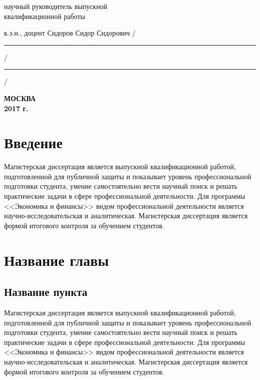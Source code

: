 \documentclass[12pt,a4paper, oneside]{extreport}
\begin{document}
\noindent
научный руководитель выпускной \\
квалификационной работы

\noindent
к.э.н., доцент Сидоров Сидор Сидорович
\hfill /\rule{6em}{0.5pt}/\rule{6em}{0.5pt}/

\hfill{}

%
%

\vfill

\begin{center}
\normalsize \bfseries МОСКВА \\ 2017 г.
\end{center}
\endgroup




\tableofcontents  %



\chapter*{Введение}


Магистерская диссертация является выпускной квалификационной работой, подготовленной для публичной защиты и показывает уровень профессиональной подготовки студента, умение самостоятельно вести научный поиск и решать практические задачи в сфере профессиональной деятельности. Для программы <<Экономика и финансы>> видом профессиональной деятельности является научно-исследовательская и аналитическая. Магистерская диссертация является формой итогового контроля за обучением студентов.


\chapter{Название главы}

\section{Название пункта}

Магистерская диссертация является выпускной квалификационной работой, подготовленной для публичной защиты и показывает уровень профессиональной подготовки студента, умение самостоятельно вести научный поиск и решать практические задачи в сфере профессиональной деятельности. Для программы <<Экономика и финансы>> видом профессиональной деятельности является научно-исследовательская и аналитическая. Магистерская диссертация является формой итогового контроля за обучением студентов.
\end{document}
